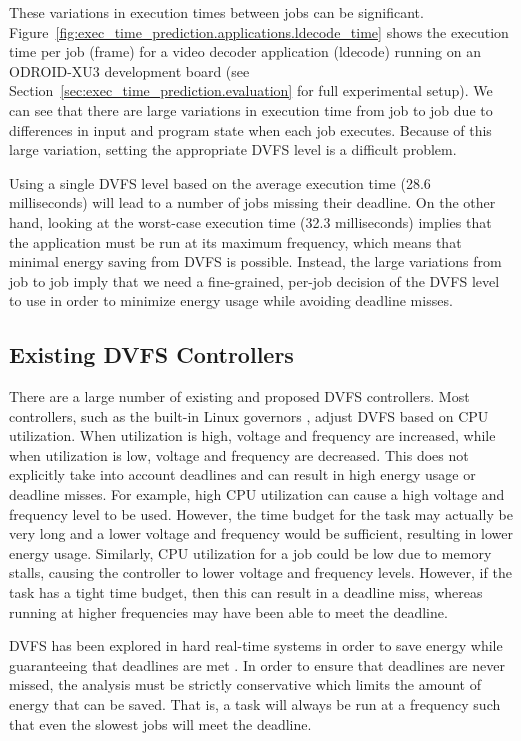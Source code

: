 These variations in execution times between jobs can be significant.
Figure~\ref{fig:exec_time_prediction.applications.ldecode_time} shows the
execution time per job (frame) for a video decoder application (ldecode)
running on an ODROID-XU3 development board (see
Section~\ref{sec:exec_time_prediction.evaluation} for full experimental setup).
We can see that there are large variations in execution time from job to job
due to differences in input and program state when each job executes. Because
of this large variation, setting the appropriate DVFS level is a difficult
problem. 

Using a single DVFS level based on the average execution time (28.6
milliseconds) will lead to a number of jobs missing their deadline. On the
other hand, looking at the worst-case execution time (32.3 milliseconds)
implies that the application must be run at its maximum frequency, which means
that minimal energy saving from DVFS is possible. Instead, the large variations
from job to job imply that we need a fine-grained, per-job decision of the DVFS
level to use in order to minimize energy usage while avoiding deadline misses.

\subsection{Existing DVFS Controllers}
\label{sec:exec_time_prediction.applications.existing}

There are a large number of existing and proposed DVFS controllers. Most
controllers, such as the built-in Linux governors \cite{linux_governors},
adjust DVFS based on CPU utilization. When utilization is high, voltage and
frequency are increased, while when utilization is low, voltage and frequency
are decreased.  This does not explicitly take into account deadlines and can
result in high energy usage or deadline misses. For example, high CPU
utilization can cause a high voltage and frequency level to be used. However,
the time budget for the task may actually be very long and a lower voltage and
frequency would be sufficient, resulting in lower energy usage. Similarly, CPU
utilization for a job could be low due to memory stalls, causing the controller
to lower voltage and frequency levels. However, if the task has a tight time
budget, then this can result in a deadline miss, whereas running at higher
frequencies may have been able to meet the deadline.

DVFS has been explored in hard real-time systems in order to save energy while
guaranteeing that deadlines are met \cite{rtdvfs-systor12}. In order to ensure
that deadlines are never missed, the analysis must be strictly conservative
which limits the amount of energy that can be saved. That is, a task will
always be run at a frequency such that even the slowest jobs will meet the
deadline. 


